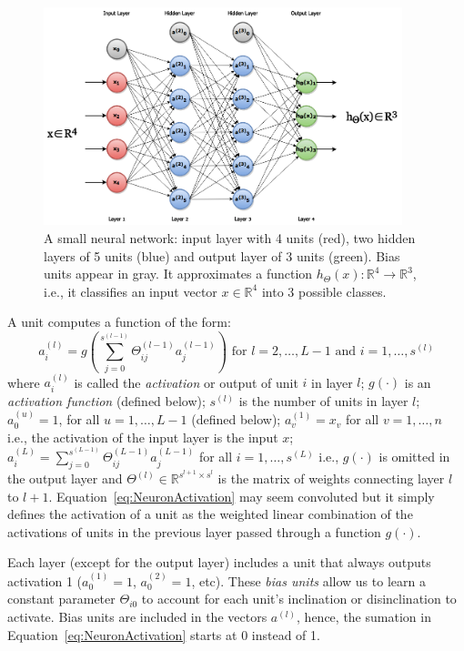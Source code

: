 \begin{figure}[h]
	\centering
	\includegraphics[width = 0.93\textwidth]{plots/neuralNetwork.png}
	\caption[An artificial neural network]{A small neural network: input layer with 4 units (red), two hidden layers of 5 units (blue) and output layer of 3 units (green). Bias units appear in gray. It approximates a function $h_\Theta(x): \mathbb{R}^4 \to \mathbb{R}^3$, i.e., it classifies an input vector $x \in \mathbb{R}^4$ into 3 possible classes.}
	\label{fig:NeuralNetwork}
\end{figure}

A unit computes a function of the form:
\begin{equation}
	a^{(l)}_i = g \left(\sum_{j=0}^{s^{(l-1)}} \Theta^{(l-1)}_{ij}a_j^{(l-1)}\right) \text{ for $l= 2,\dots,L-1$ and $i = 1,\dots,s^{(l)}$}
	\label{eq:NeuronActivation}
\end{equation}
where $a^{(l)}_i$ is called the \emph{activation} or output of unit $i$ in layer $l$;
$g(\cdot)$ is an \emph{activation function} (defined below);
$s^{(l)}$ is the number of units in layer $l$;
$a^{(u)}_0 = 1$, for all $u = 1, \ldots, L-1$ (defined below);
$a^{(1)}_v = x_v$ for all $v = 1, \ldots, n$ i.e., the activation of the input layer is the input $x$;
$a^{(L)}_i = \sum_{j=0}^{s^{(L-1)}} \Theta^{(L-1)}_{ij}a_j^{(L-1)}$ for all $i = 1,\dots,s^{(L)}$ i.e., $g(\cdot)$ is omitted in the output layer
and $\Theta^{(l)} \in \mathbb{R}^{s^{l+1} \times s^{l}} $ is the matrix of weights connecting layer $l$ to $l+1$. Equation~\ref{eq:NeuronActivation} may seem convoluted but it simply defines the activation of a unit as the weighted linear combination of the activations of units in the previous layer passed through a function $g(\cdot)$. 

Each layer (except for the output layer) includes a unit that always outputs activation 1 ($a^{(1)}_0 = 1$, $a^{(2)}_0 = 1$, etc). These \emph{bias units} allow us to learn a constant parameter $\Theta_{i 0}$ to account for each unit's inclination or disinclination to activate.
Bias units are included in the vectors $a^{(l)}$, hence, the sumation in Equation~\ref{eq:NeuronActivation} starts at 0 instead of 1.

